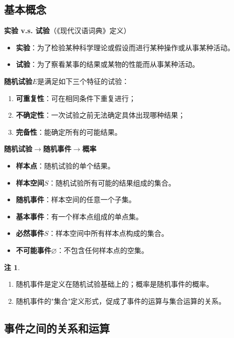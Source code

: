 \documentclass[11pt,a4paper]{report}
\theoremstyle{definition}
\newtheorem{remark}{注}[chapter]
\theoremstyle{plain}
\begin{document}
\subsection{基本概念}

\textbf{实验 v.s. 试验}（《现代汉语词典》定义）
\begin{itemize}[leftmargin=2em]
    \item \textbf{实验}：为了检验某种科学理论或假设而进行某种操作或从事某种活动。
    \item \textbf{试验}：为了察看某事的结果或某物的性能而从事某种活动。
\end{itemize}

\textbf{随机试验}$E$是满足如下三个特征的试验：
\begin{enumerate}[label=\arabic*.,leftmargin=2em]
    \item \textbf{可重复性}：可在相同条件下重复进行；
    \item \textbf{不确定性}：一次试验之前无法确定具体出现哪种结果；
    \item \textbf{完备性}：能确定所有的可能结果。
\end{enumerate}

\textbf{随机试验}$\to$\textbf{随机事件}$\to$\textbf{概率}

\begin{itemize}[leftmargin=2em]
    \item \textbf{样本点}：随机试验的单个结果。
    \item \textbf{样本空间}$S$：随机试验所有可能的结果组成的集合。
    \item \textbf{随机事件}：样本空间的任意一个子集。
    \item \textbf{基本事件}：有一个样本点组成的单点集。
    \item \textbf{必然事件}$S$：样本空间中所有样本点构成的集合。
    \item \textbf{不可能事件}$\varnothing$：不包含任何样本点的空集。
\end{itemize}

\begin{remark}
\begin{enumerate}[label=\arabic*.,leftmargin=2em]
    \item 随机事件是定义在随机试验基础上的；概率是随机事件的概率。
    \item 随机事件的"集合"定义形式，促成了事件的运算与集合运算的关系。
\end{enumerate}
\end{remark}

\subsection{事件之间的关系和运算}
\end{document}
